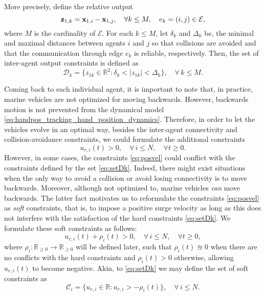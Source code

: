 More precisely, define the relative output 
\begin{equation}\label{eq:z1k-def}
    \mathbf{z}_{1, k} = \mathbf{x}_{1, i} - \mathbf{x}_{1, j}, \quad \forall k\leq M, \quad e_k=(i,j)\in\mathcal{E},
\end{equation}
where $M$ is the cardinality of $\mathcal{E}$.
For each $k\leq M$, let $\delta_k$ and ${\Delta_k}$ be, the minimal and maximal distances between agents $i$ and $j$ so that collisions are avoided and that the communication through edge $e_k$ is reliable, respectively.
Then, the set of inter-agent output constraints is defined as
\begin{equation}
\label{eq:setDk} \mathcal D_k = \big\{z_{1k}\in\mathbb{R}^{2}:\delta_k<|z_{1k}|<{\Delta_k}\big\},\quad \forall\, k\leq M.
\end{equation}

Coming back to each individual agent, it is important to note that, in practice, marine vehicles are not optimized for moving backwards. However, backwards motion is not prevented from the dynamical model \eqref{eq:handpos_tracking_hand_position_dynamics}.
Therefore, in order to let the vehicles evolve in an optimal way, besides the inter-agent connectivity and collision-avoidance constraints, we could formulate the additional constraints
\begin{equation}
\label{eq:posvel} u_{r, i}(t)> 0,\quad \forall\, i\leq N, \quad \forall t\geq 0.
\end{equation}
However, in some cases, the constraints \eqref{eq:posvel} could conflict with the constraints defined by the set \eqref{eq:setDk}. 
Indeed, there might exist situations when the only way to avoid a collision or avoid losing connectivity is to move backwards. 
Moreover, although not optimized to, marine vehicles \emph{can} move backwards.
The latter fact motivates us to reformulate the constraints \eqref{eq:posvel} as \emph{soft} constraints, that is, to impose a positive surge velocity as long as this does not interfere with the satisfaction of the hard constraints \eqref{eq:setDk}.
We formulate these soft constraints as follows:
\begin{equation}
\label{eq:soft} u_{r, i}(t) + \rho_i(t) > 0,\quad \forall\, i\leq N, \quad \forall t\geq 0,
\end{equation}
where $\rho_i:\mathbb{R}_{\geq 0}\to\mathbb{R}_{\geq 0}$ will be defined later, such that $\rho_i(t)\approxeq0$ when there are no conflicts with the hard constraints and $\rho_i(t)>0$ otherwise, allowing $u_{r, i}(t)$ to become negative. Akin, to \eqref{eq:setDk} we may define the set of soft constraints as
\begin{equation}
\label{eq:setC} \mathcal{C}_i = \big\{u_{r, i}\in\mathbb{R}:u_{r, i}>-\rho_i(t)\big\},\quad \forall\, i\leq N.
\end{equation}

